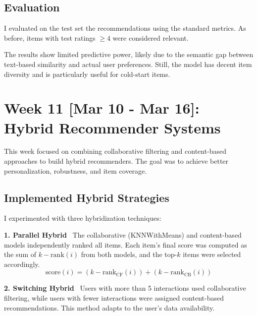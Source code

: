 \documentclass[11pt,a4paper]{article}
\begin{document}
\subsection{Evaluation}
I evaluated on the test set the recommendations using the standard metrics. As before, items with test ratings $\geq 4$ were considered relevant.

\begin{table}[H]
\centering
{}
\caption{Content-Based Recommender Evaluation Results}
\label{tab:cb-results}
\end{table}

The results show limited predictive power, likely due to the semantic gap between text-based similarity and actual user preferences. Still, the model has decent item diversity and is particularly useful for cold-start items.

\section{Week 11 [Mar 10 - Mar 16]: Hybrid Recommender Systems}

This week focused on combining collaborative filtering and content-based approaches to build hybrid recommenders. The goal was to achieve better personalization, robustness, and item coverage.

\subsection{Implemented Hybrid Strategies}
I experimented with three hybridization techniques:

\textbf{1. Parallel Hybrid} \
The collaborative (KNNWithMeans) and content-based models independently ranked all items. 
Each item's final score was computed as the sum of $k - \mathrm{rank}(i)$ from both models, and the top-$k$ items were selected accordingly.
\[
\mathrm{score}(i) = (k - \mathrm{rank}_{\mathrm{CF}}(i)) + (k - \mathrm{rank}_{\mathrm{CB}}(i))
\]

\textbf{2. Switching Hybrid} \
Users with more than 5 interactions used collaborative filtering, while users with fewer interactions were assigned content-based recommendations. This method adapts to the user's data availability.
\end{document}
